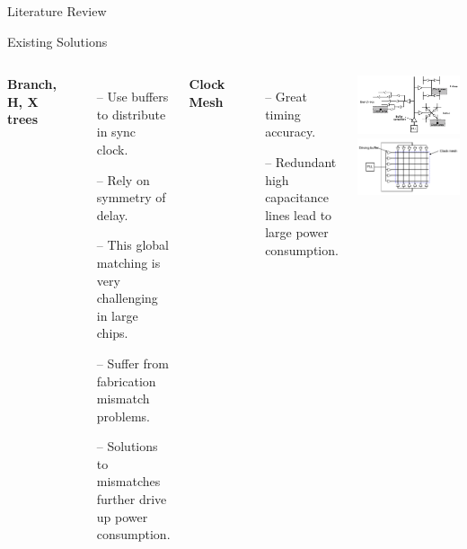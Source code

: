 \documentclass{beamer}
\begin{document}
\begin{frame}{Literature Review}

\end{frame}

\begin{frame}{Existing Solutions}
	\begin{columns}
		\textbf{Branch, H, X trees}
		\begin{itemize}
			\item[--]
				Use buffers to distribute in sync clock.
			\item[--]
				Rely on symmetry of delay.
			\item[--]
				This global matching is very challenging in large chips.
			\item[--]
				Suffer from fabrication mismatch problems.	
			\item[--]
				Solutions to mismatches further drive up power consumption.
		\end{itemize}
		\textbf{Clock Mesh}
		\begin{itemize}
			\item[--]
				Great timing accuracy.
			\item[--]
				Redundant high capacitance lines lead to large power consumption.
		\end{itemize}
			\includegraphics[scale=0.4]{eldar_trees}
			\includegraphics[scale=0.4]{eldar_mesh}
	\end{columns}
 
\end{frame}
\end{document}
